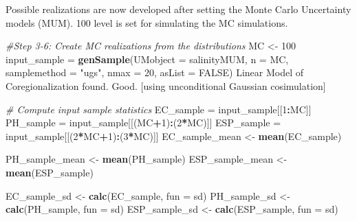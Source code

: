 \documentclass[
  10pt,
  b5paper,
]{book}
\newenvironment{Shaded}{\begin{snugshade}}{\end{snugshade}}
\newcommand{\CommentTok}[1]{\textcolor[rgb]{0.56,0.35,0.01}{\textit{#1}}}
\newcommand{\DataTypeTok}[1]{\textcolor[rgb]{0.13,0.29,0.53}{#1}}
\newcommand{\DecValTok}[1]{\textcolor[rgb]{0.00,0.00,0.81}{#1}}
\newcommand{\KeywordTok}[1]{\textcolor[rgb]{0.13,0.29,0.53}{\textbf{#1}}}
\newcommand{\NormalTok}[1]{#1}
\newcommand{\OperatorTok}[1]{\textcolor[rgb]{0.81,0.36,0.00}{\textbf{#1}}}
\newcommand{\OtherTok}[1]{\textcolor[rgb]{0.56,0.35,0.01}{#1}}
\newcommand{\StringTok}[1]{\textcolor[rgb]{0.31,0.60,0.02}{#1}}
\begin{document}
Possible realizations are now developed after setting the Monte Carlo Uncertainty models (MUM). 100 level is set for simulating the MC simulations.

\begin{Shaded}
\begin{Highlighting}[]
\CommentTok{#Step 3-6: Create MC realizations from the distributions}
\NormalTok{	MC <-}\StringTok{ }\DecValTok{100}
\NormalTok{	input_sample =}\StringTok{ }\KeywordTok{genSample}\NormalTok{(}\DataTypeTok{UMobject =}\NormalTok{ salinityMUM, }\DataTypeTok{n =}\NormalTok{ MC, }\DataTypeTok{samplemethod =} \StringTok{"ugs"}\NormalTok{,	nmax}
\NormalTok{=}\StringTok{ }\DecValTok{20}\NormalTok{, }\DataTypeTok{asList =} \OtherTok{FALSE}\NormalTok{)}
\NormalTok{Linear Model of Coregionalization found. Good. [using unconditional Gaussian cosimulation]}

\CommentTok{# Compute input sample statistics}
\NormalTok{EC_sample =}\StringTok{ }\NormalTok{input_sample[[}\DecValTok{1}\OperatorTok{:}\NormalTok{MC]]}
\NormalTok{PH_sample =}\StringTok{ }\NormalTok{input_sample[[(MC}\OperatorTok{+}\DecValTok{1}\NormalTok{)}\OperatorTok{:}\NormalTok{(}\DecValTok{2}\OperatorTok{*}\NormalTok{MC)]]}
\NormalTok{ESP_sample =}\StringTok{ }\NormalTok{input_sample[[(}\DecValTok{2}\OperatorTok{*}\NormalTok{MC}\OperatorTok{+}\DecValTok{1}\NormalTok{)}\OperatorTok{:}\NormalTok{(}\DecValTok{3}\OperatorTok{*}\NormalTok{MC)]]}
\NormalTok{EC_sample_mean <-}\StringTok{ }\KeywordTok{mean}\NormalTok{(EC_sample)}


\NormalTok{PH_sample_mean <-}\StringTok{ }\KeywordTok{mean}\NormalTok{(PH_sample)}
\NormalTok{ESP_sample_mean <-}\StringTok{ }\KeywordTok{mean}\NormalTok{(ESP_sample)}

\NormalTok{EC_sample_sd <-}\StringTok{ }\KeywordTok{calc}\NormalTok{(EC_sample, }\DataTypeTok{fun =}\NormalTok{ sd)}
\NormalTok{PH_sample_sd <-}\StringTok{ }\KeywordTok{calc}\NormalTok{(PH_sample, }\DataTypeTok{fun =}\NormalTok{ sd)}
\NormalTok{ESP_sample_sd <-}\StringTok{ }\KeywordTok{calc}\NormalTok{(ESP_sample, }\DataTypeTok{fun =}\NormalTok{ sd)}


\end{Highlighting}
\end{Shaded}
\end{document}
